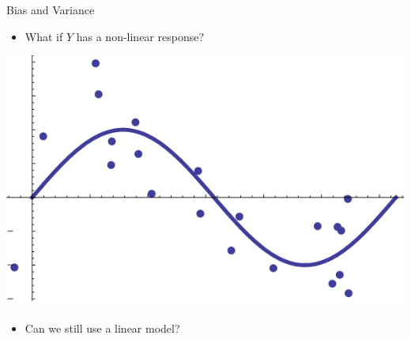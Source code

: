 \begin{frame}{Bias and Variance}

\begin{itemize}
    \item What if $Y$ has a non-linear response?
\end{itemize}

\begin{center}
    \includegraphics[width=0.65\linewidth]{images/linear-regression/linear-regression-13.png}
\end{center}

\vspace{-0.3cm}
\begin{itemize}
    \item Can we still use a linear model?
\end{itemize}

\end{frame}


